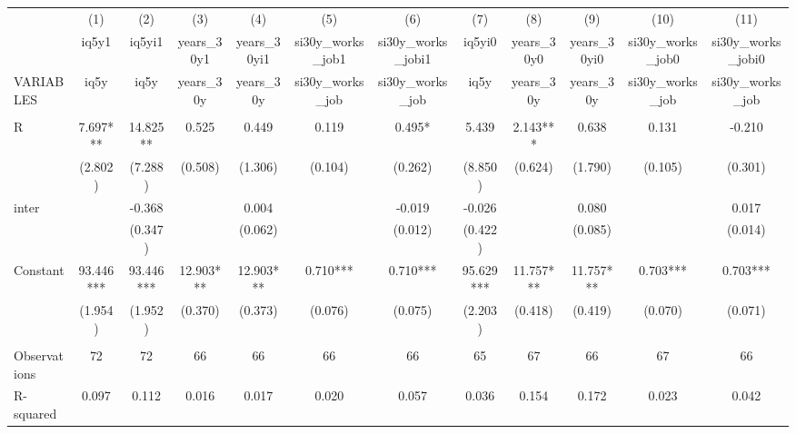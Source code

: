 \begin{tabular}{lccccccccccc} \hline
 & (1) & (2) & (3) & (4) & (5) & (6) & (7) & (8) & (9) & (10) & (11) \\
 & iq5y1 & iq5yi1 & years\_30y1 & years\_30yi1 & si30y\_works\_job1 & si30y\_works\_jobi1 & iq5yi0 & years\_30y0 & years\_30yi0 & si30y\_works\_job0 & si30y\_works\_jobi0 \\
VARIABLES & iq5y & iq5y & years\_30y & years\_30y & si30y\_works\_job & si30y\_works\_job & iq5y & years\_30y & years\_30y & si30y\_works\_job & si30y\_works\_job \\ \hline
 &  &  &  &  &  &  &  &  &  &  &  \\
R & 7.697*** & 14.825** & 0.525 & 0.449 & 0.119 & 0.495* & 5.439 & 2.143*** & 0.638 & 0.131 & -0.210 \\
 & (2.802) & (7.288) & (0.508) & (1.306) & (0.104) & (0.262) & (8.850) & (0.624) & (1.790) & (0.105) & (0.301) \\
inter &  & -0.368 &  & 0.004 &  & -0.019 & -0.026 &  & 0.080 &  & 0.017 \\
 &  & (0.347) &  & (0.062) &  & (0.012) & (0.422) &  & (0.085) &  & (0.014) \\
Constant & 93.446*** & 93.446*** & 12.903*** & 12.903*** & 0.710*** & 0.710*** & 95.629*** & 11.757*** & 11.757*** & 0.703*** & 0.703*** \\
 & (1.954) & (1.952) & (0.370) & (0.373) & (0.076) & (0.075) & (2.203) & (0.418) & (0.419) & (0.070) & (0.071) \\
 &  &  &  &  &  &  &  &  &  &  &  \\
Observations & 72 & 72 & 66 & 66 & 66 & 66 & 65 & 67 & 66 & 67 & 66 \\
 R-squared & 0.097 & 0.112 & 0.016 & 0.017 & 0.020 & 0.057 & 0.036 & 0.154 & 0.172 & 0.023 & 0.042 \\ \hline
\end{tabular}
